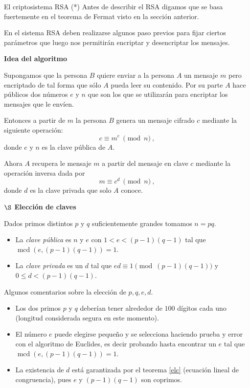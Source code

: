\begin{section}{El criptosistema RSA (*)}
Antes de describir el RSA digamos que se basa fuertemente en el teorema de Fermat visto en la sección anterior. 


En el sistema RSA deben realizarse algunos paso previos para fijar ciertos parámetros que luego nos permitirán encriptar y desencriptar los mensajes.



\noindent\textbf{Idea del  algoritmo}

Supongamos que la persona $B$  quiere enviar a la persona $A$ un mensaje $m$ pero encriptado de tal forma que sólo $A$ pueda leer su contenido. Por su parte $A$ hace públicos dos números $e$ y $n$ que son los que se utilizarán para encriptar los mensajes que le envíen. 

Entonces a partir de $m$ la persona $B$ genera un mensaje cifrado $c$ mediante la siguiente ope\-ra\-ción:
$$
    c\equiv m^e\ \pmod{n}\ ,
$$
donde $e$ y $n$ es la clave pública de $A$.

Ahora $A$ recupera le mensaje $m$ a partir del mensaje en clave $c$ mediante la operación inversa dada por
$$
    m\equiv c^d\ \pmod{n}\ ,
$$
donde $d$ es la clave privada que solo $A$ conoce.




\noindent \textbf{ $\S$ Elección de claves}



Dados primos distintos $p$ y $q$ suficientemente grandes tomamos $n = pq$. 
\begin{itemize}
	\item  La \emph{clave pública} es $n$ y $e$ con $1 < e < (p-1)(q-1)$ tal que $\operatorname{mcd}(e, (p-1)(q-1)) = 1$. 
	\item  La \emph{clave privada} es un $d$ tal que $ed \equiv 1 \pmod{(p-1)(q-1)}$ y $0 \le d <(p-1)(q-1)$.
\end{itemize}


\begin{observacion} Algunos comentarios sobre la elección de $p,q,e,d$.
\begin{itemize}
\item
Los dos primos $p$ y $q$ deberían tener alrededor de $100$ dígitos cada uno (longitud considerada segura en este momento).
\item
El número $e$ puede elegirse pequeño y se selecciona haciendo prueba y error con el algoritmo de Euclides, es decir probando hasta encontrar un $e$ tal que $\operatorname{mcd}(e, (p-1)(q-1)) = 1$.
\item
La existencia de $d$ está garantizada por el teorema \ref{elc} (ecuación lineal de congruencia), pues $e$ y $(p-1)(q-1)$ son coprimos.
\end{itemize}


\end{observacion}
\end{section}
